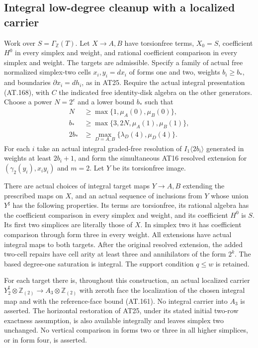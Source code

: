 \subsection{Integral low-degree cleanup with a localized carrier}

\begin{theorem}
\label{AS0931}
Work over $S=\Gamma_{\mathbb Z}(T)$.
Let $X\to A,B$ have torsionfree terms, $X_0=S$,
coefficient $H^0$ in every simplex and weight, and rational
coefficient comparison in every simplex and weight.
The targets are admissible. Specify a family of actual free
normalized simplex-two cells $x_i,y_i=dx_i$ of forms one and
two, weights $b_i\geq b_*$, and boundaries
$\partial x_i=dh_i$, as in AT25. Require the actual integral
presentation (AT.168), with $C$ the indicated free identity-disk
algebra on the other generators.
Choose a power $N=2^e$ and a lower bound $b_*$ such that
\[
 \begin{split}
 N&\geq\max\{1,\mu_A(0),\mu_B(0)\},\\
 b_*&\geq\max\{3,2N,\mu_A(1),\mu_B(1)\},\\
 2b_*&\geq\max_{D=A,B}\{\lambda_D(4),\mu_D(4)\}.
 \end{split}
 \tag{S09.168}
\]
For each $i$ take an actual integral graded-free resolution
of $I_1\langle2b_i\rangle$ generated in weights at least
$2b_i+1$, and form the simultaneous AT16 resolved extension
for $(\gamma_2(y_i),x_i y_i)$ and $m=2$.
Let $Y$ be its torsionfree image.

There are actual choices of integral target maps $Y\to A,B$
extending the prescribed maps on $X$, and an actual sequence
of inclusions from $Y$ whose union $Y^\sharp$ has the following
properties. Its terms are torsionfree, its rational algebra
has the coefficient comparison in every simplex and weight,
and its coefficient $H^0$ is $S$. Its first two simplices are
literally those of $X$. In simplex two it has coefficient
comparison through form three in every weight.
All extensions have actual integral maps to both targets.
After the original resolved extension, the added two-cell
repairs have cell arity at least three and annihilators of the
form $2^k$. The based degree-one saturation is integral.
The support condition $q\leq w$ is retained.

For each target there is, throughout this construction, an
actual localized carrier
$Y_2^\sharp\otimes\mathbb Z_{(2)}\to A_3\otimes\mathbb Z_{(2)}$
with zeroth face the localization of the chosen integral map
and with the reference-face bound (AT.161).
No integral carrier into $A_3$ is asserted.
The horizontal restoration of AT25, under its stated initial
two-row exactness assumption, is also available integrally and
leaves simplex two unchanged.
No vertical comparison in forms two or three in all higher
simplices, or in form four, is asserted.
\end{theorem}

